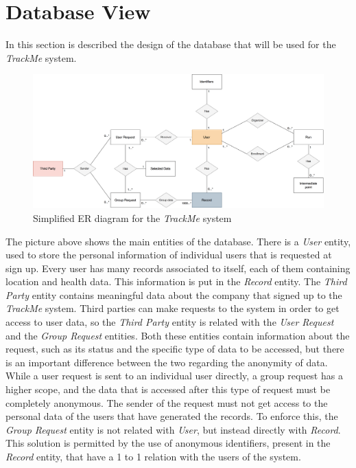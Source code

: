\section{Database View}

In this section is described the design of the database that will be used for the \textit{TrackMe} system. 

\begin{figure}[H]
\includegraphics[scale=0.13,keepaspectratio]{./Pictures/ER-diagram.png}
\centering
\caption{Simplified ER diagram for the \textit{TrackMe} system}
\end{figure}

The picture above shows the main entities of the database. There is a \textit{User} entity, used to store the personal information of individual users that is requested at sign up. Every user has many records associated to itself, each of them containing location and health data. This information is put in the \textit{Record} entity. The \textit{Third Party} entity contains meaningful data about the company that signed up to the \textit{TrackMe} system. Third parties can make requests to the system in order to get access to user data, so the \textit{Third Party} entity is related with the \textit{User Request} and the \textit{Group Request} entities. Both these entities contain information about the request, such as its status and the specific type of data to be accessed, but there is an important difference between the two regarding the anonymity of data. While a user request is sent to an individual user directly, a group request has a higher scope, and the data that 
is accessed after this type of request must be completely anonymous. The sender of the request must not get access to the personal data of the users that have generated the records. To enforce this, the \textit{Group Request} entity is not related with \textit{User}, but instead directly with \textit{Record}. This solution is permitted by the use of anonymous identifiers, present in the \textit{Record} entity, that have a 1 to 1 relation with the users of the system.

